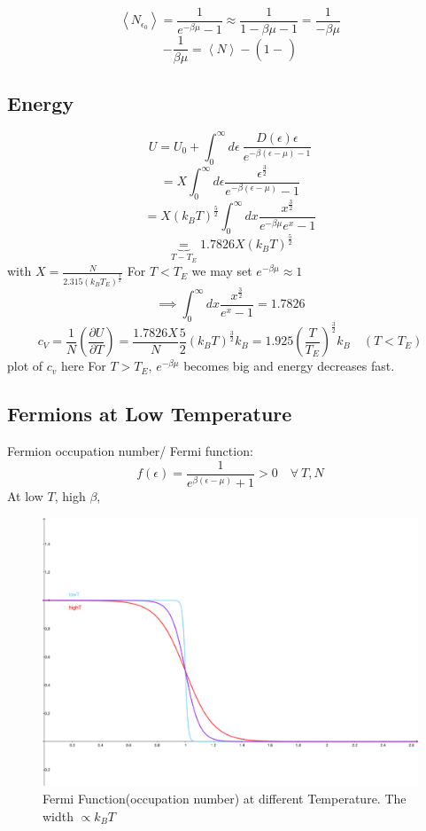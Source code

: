 \documentclass[11pt]{book}
\theoremstyle{definition}
\begin{document}
\[ \left \langle N_{\epsilon_0} \right \rangle = \frac{1}{e^{-\beta \mu}-1} \approx \frac{1}{1-\beta \mu -1} = \frac{1}{-\beta \mu} \] 
\[-\frac{1}{\beta \mu} = \left \langle N \right \rangle -  \left( 1- \frac{}{} \right) \] 
\subsection{Energy}
\[ U = U_0 + \int_{0}^{\infty} d \epsilon \: \frac{D(\epsilon)\epsilon}{e^{-\beta(\epsilon-\mu)-1}} \] 
\[ = X \int_0^{\infty} d \epsilon \frac{\epsilon^{\frac{3}{2}}}{e^{-\beta( \epsilon-\mu )}-1} \] 
\[ = X(k_BT)^{\frac{5}{2}} \int_{0}^{\infty} dx \frac{x^{\frac{3}{2}}}{e^{-\beta \mu}e^{x}-1} \] 
\[ \underbrace{=}_{T-T_E} 1.7826X(k_BT)^{\frac{5}{2}} \] 
with $ X = \frac{N}{2.315(k_BT_E)^{\frac{3}{2}}} $ 
For $ T < T_E $ we may set $ e^{-\beta \mu} \approx 1$ 
\[ \implies \int_{0}^{\infty} dx \frac{x^{\frac{3}{2}}}{e^{x}-1}=1.7826 \] 
\[ c_V = \frac{1}{N}\left( \frac{\partial U}{\partial T} \right) = \frac{1.7826X}{N} \frac{5}{2}(k_BT)^{\frac{3}{2}} k_B = 1.925 \left( \frac{T}{T_E} \right)^{\frac{3}{2}}k_B \quad (T<T_E) \] 
plot of $c_v$ here
For $ T > T_E $, $e^{-\beta \mu}$ becomes big and energy decreases fast.

\subsection{Fermions at Low Temperature}
Fermion occupation number/ Fermi function:
\[ f(\epsilon) = \frac{1}{e^{\beta(\epsilon-\mu)}+1} > 0 \quad \forall \: T,N\] 
At low $ T $, high $ \beta $,
\begin{figure}[ht]
	\centering
	\includegraphics[width=\linewidth]{fermi-func.pdf}
	\caption{Fermi Function(occupation number) at different Temperature. The width $ \propto k_B T$ }
	\label{fig:fermifunc}
\end{figure}
\end{document}
